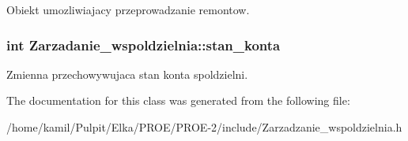 \begin{DoxyItemize}
\item Obiekt umozliwiajacy przeprowadzanie remontow. 
\end{DoxyItemize}\hypertarget{class_zarzadanie__wspoldzielnia_ace2917345d07ecbb67d67b5bbe066192}{}
\subsubsection[{stan\+\_\+konta}]{\setlength{\rightskip}{0pt plus 5cm}int Zarzadanie\+\_\+wspoldzielnia\+::stan\+\_\+konta\hspace{0.3cm}{\ttfamily [protected]}}\label{class_zarzadanie__wspoldzielnia_ace2917345d07ecbb67d67b5bbe066192}

\begin{DoxyItemize}
\item Zmienna przechowywujaca stan konta spoldzielni. 
\end{DoxyItemize}

The documentation for this class was generated from the following file\+:\begin{DoxyCompactItemize}
\item 
/home/kamil/\+Pulpit/\+Elka/\+P\+R\+O\+E/\+P\+R\+O\+E-\/2/include/Zarzadzanie\+\_\+wspoldzielnia.\+h\end{DoxyCompactItemize}
